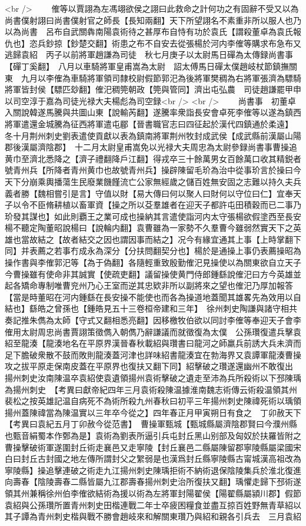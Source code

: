 <br />
　　傕等以賈詡為左馮翊欲侯之詡曰此救命之計何功之有固辭不受又以為尚書僕射詡曰尚書僕射官之師長【長知兩翻】天下所望詡名不素重非所以服人也乃以為尚書　呂布自武關犇南陽袁術待之甚厚布自恃有功於袁氏【謂殺董卓為袁氏報仇也】恣兵鈔掠【鈔楚交翻】術患之布不自安去從張楊於河内李傕等購求布急布又逃歸袁紹　丙子以前將軍趙謙為司徒　秋七月庚子以太尉馬日磾為太傳録尚書事【磾丁奚翻】　八月以車騎將軍皇甫嵩為太尉　詔太傅馬日磾太僕趙岐杖節鎮撫關東　九月以李傕為車騎將軍領司隸校尉假節郭汜為後將軍樊稠為右將軍張濟為驃騎將軍皆封侯【驃匹玅翻】傕汜稠筦朝政【筦與管同】濟出屯弘農　司徒趙謙罷甲申以司空淳于嘉為司徒光禄大夫楊彪為司空録<br />
<br />
　　尚書事　初董卓入關說韓遂馬騰與共圖山東【說輸芮翻】遂騰率衆詣長安會卓死李傕等以遂為鎮西將軍遣還金城騰為征西將軍遣屯郿【晉書職官志曰四征起於漢代四鎮通於柔遠】　冬十月荆州刺史劉表遣使貢獻以表為鎮南將軍荆州牧封成武侯【成武縣前漢屬山陽郡後漢屬濟陰郡】　十二月太尉皇甫嵩免以光禄大夫周忠為太尉參録尚書事曹操追黄巾至濟北悉降之【濟子禮翻降戶江翻】得戎卒三十餘萬男女百餘萬口收其精鋭者號青州兵【所降者青州黄巾也故號青州兵】操辟陳留毛玠為治中從事玠言於操曰今天下分崩乘輿播蕩生民廢業饑饉流亡公家無經歲之儲百姓無安固之志難以持久夫兵義者勝【魏相嘗引是言】守值以財【易大傳曰何以聚人曰財何以守位曰仁】宜奉天子以令不臣脩耕植以畜軍資【操之所以芟羣雄者在迎天子都許屯田積穀而已二事乃玠發其謀也】如此則覇王之業可成也操納其言遣使詣河内太守張楊欲假塗西至長安楊不聽定陶董昭說楊曰【說輪内翻】袁曹雖為一家勢不久羣曹今雖弱然實天下之英雄也當故結之【故者結交之因也謂因事而結之】况今有緣宜通其上事【上時掌翻下同】并表薦之若事冇成永為深分【分扶問翻契分也】楊於是通操上事仍表薦操昭為操作書與李傕郭汜等【為于偽翻】各隨輕重致殷勤傕汜見操使以為關東欲自立天子今曹操雖有使命非其誠實【使疏吏翻】議留操使黄門侍郎鍾繇說傕汜曰方今英雄並起各矯命專制唯曹兖州乃心王室而逆其忠欵非所以副將來之望也傕汜乃厚加報答【當是時董昭在河内鍾繇在長安操不能使也而各為操道地蓋聞其雄畧先為效用以自結也】繇皓之曾孫也【鍾皓見五十三卷桓帝建和三年】　徐州刺史陶謙與諸守相共奏記推朱儁為太師【守式又翻相悉亮翻】因移檄牧伯欲以同討李傕等奉迎天子會李傕用太尉周忠尚書賈詡策徵儁入朝儁乃辭謙議而就徵復為太僕　公孫瓚復遣兵擊袁紹至龍湊【龍湊地名在平原界漢晉春秋載紹與瓚書曰龍河之師羸兵前誘大兵未濟而足下膽破衆散不鼓而敗則龍湊蓋河津也詳味紹書龍湊宜在勃海界又袁譚軍龍湊曹操攻之拔平原走保南皮蓋在平原界也復扶又翻下同】紹擊破之瓚遂還幽州不敢復出　揚州刺史汝南陳温卒袁紹使袁遺領揚州袁術擊破之遺走至沛為兵所殺術以下邳陳瑀為揚州刺史　【考異曰獻帝紀四年三月袁術殺陳温據淮南魏志術傳云術殺温領其州裴松之按英雄記温自病死不為術所殺九州春秋曰初平三年揚州刺史陳禕死術以瑀領揚州蓋陳禕當為陳温實以三年卒今從之】四年春正月甲寅朔日有食之　丁卯赦天下　【考異曰袁紀五月丁卯赦今從范書】　曹操軍甄城【甄城縣屬濟陰郡賢曰今濮州縣也甄音絹蜀本作鄄為是】袁術為劉表所逼引兵屯封丘黑山别部及匈奴於扶羅皆附之曹操擊破術軍遂圍封丘術走襄邑又走寧陵【封丘襄邑二縣屬陳留郡寧陵縣屬梁國宋白曰封丘古封國之地左傳所謂封父之䌓弱是也漢爲封丘縣寧陵縣古甯城漢高祖改為寧陵縣】操追擊連破之術走九江揚州刺史陳瑀拒術不納術退保陰陵集兵於淮北復進向壽春【陰陵壽春二縣皆屬九江郡壽春揚州刺史治所復扶又翻】瑀懼走歸下邳術遂領其州兼稱徐州伯李傕欲結術為援以術為左將軍封陽翟侯【陽翟縣屬潁川郡】假節　袁紹與公孫瓚所置青州刺史田楷連戰二年士卒疲困糧食並盡互掠百姓野無青草紹以其子譚為青州刺史楷與戰不勝會趙岐來和解關東瓚乃與紹和親各引兵去　三月袁紹